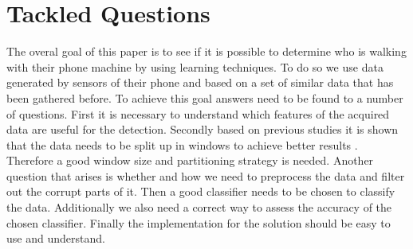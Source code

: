 \section{Tackled Questions}

The overal goal of this paper is to see if it is possible to determine  who is walking with their phone machine by using learning techniques. To do so we use data generated by sensors of their phone and based on a set of similar data that has been gathered before.
To achieve this goal answers need to be found to a number of questions.
First it is necessary to understand which features of the acquired data are useful for the detection. Secondly  based on previous studies  it is shown that the data needs to be split up in windows to achieve better results \cite{bao2004activity}. Therefore a good window size and partitioning strategy is needed. Another question that arises is whether and how we need to preprocess the data and filter out the corrupt parts of it. Then a good classifier needs to be chosen to classify the data. Additionally we also need a correct way to assess the accuracy of the chosen classifier.
Finally the implementation for the solution should be easy to use and understand.